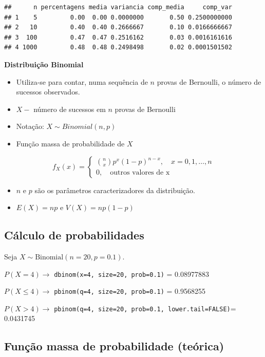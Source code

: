 \documentclass[
]{book}
\begin{document}
\begin{verbatim}
##      n percentagens media variancia comp_media     comp_var
## 1    5         0.00  0.00 0.0000000       0.50 0.2500000000
## 2   10         0.40  0.40 0.2666667       0.10 0.0166666667
## 3  100         0.47  0.47 0.2516162       0.03 0.0016161616
## 4 1000         0.48  0.48 0.2498498       0.02 0.0001501502
\end{verbatim}

\textbf{Distribuição Binomial}

\begin{itemize}
\item
  Utiliza-se para contar, numa sequência de \(n\) provas de Bernoulli, o
  número de sucessos observados.
\item
  \(X -\) número de sucessos em \(n\) provas de Bernoulli
\item
  Notação: \(X \sim Binomial(n,p)\)
\item
  Função massa de probabilidade de \(X\)
\end{itemize}

\[f_{X}(x) = \begin{cases}
\binom{n}{x}p^{x}(1-p)^{n-x}, \quad x=0,1,\ldots,n \\
0, \quad \text{outros valores de x}
\end{cases}\]

\begin{itemize}
\item
  \(n\) e \(p\) são os parâmetros caracterizadores da distribuição.
\item
  \(E(X)=np\) e \(V(X)=np(1-p)\)
\end{itemize}

\subsection{Cálculo de probabilidades}\label{cuxe1lculo-de-probabilidades-5}

Seja \(X\sim\text{Binomial}(n=20, p=0.1)\).

\(P(X = 4) \to\) \texttt{dbinom(x=4,\ size=20,\ prob=0.1)} = 0.08977883

\noindent \(P(X\leq 4) \to\) \texttt{pbinom(q=4,\ size=20,\ prob=0.1)} = 0.9568255

\noindent \(P(X > 4)\to\)
\texttt{pbinom(q=4,\ size=20,\ prob=0.1,\ lower.tail=FALSE)}= 0.0431745

\subsection{Função massa de probabilidade (teórica)}\label{funuxe7uxe3o-massa-de-probabilidade-teuxf3rica-2}
\end{document}
